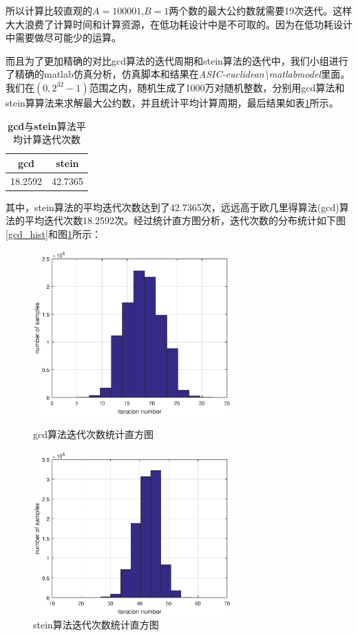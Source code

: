 \documentclass[12pt]{article}
\begin{document}
所以计算比较直观的$A = 100001$,$B = 1$两个数的最大公约数就需要19次迭代。这样大大浪费了计算时间和计算资源，在低功耗设计中是不可取的。因为在低功耗设计中需要做尽可能少的运算。

而且为了更加精确的对比gcd算法的迭代周期和stein算法的迭代中，我们小组进行了精确的matlab仿真分析，仿真脚本和结果在\textit{ASIC-euclidean\textbackslash matlabmodel}里面。我们在$(0,2^{32}-1)$范围之内，随机生成了1000万对随机整数，分别用gcd算法和stein算算法来求解最大公约数，并且统计平均计算周期，最后结果如表\ref{average_iteration}所示。

\begin{table}[!htb]
\centering
\begin{tabular}{cc}
\hline 
gcd & stein \\
\hline 
18.2592 & 42.7365\\
\hline 
\end{tabular}
\caption{\textbf{gcd}与\textbf{stein}算法平均计算迭代次数}
\label{average_iteration}
\end{table}


其中，stein算法的平均迭代次数达到了42.7365次，远远高于欧几里得算法(gcd)算法的平均迭代次数18.2592次。经过统计直方图分析，迭代次数的分布统计如下图\ref{gcd_hist}和图\ref{stein_hist}所示：

\begin{figure}[H]
\begin{minipage}[t]{0.5\linewidth}
\centering
\includegraphics[width=3in]{./matlab/gcd_hist.eps}
\caption{gcd算法迭代次数统计直方图}
\label{gcd_hist}
\end{minipage}%
\begin{minipage}[t]{0.5\linewidth}
\centering
\includegraphics[width=3in]{./matlab/stein_hist.eps}
\caption{stein算法迭代次数统计直方图}
\label{stein_hist}
\end{minipage}
\end{figure}
\end{document}
